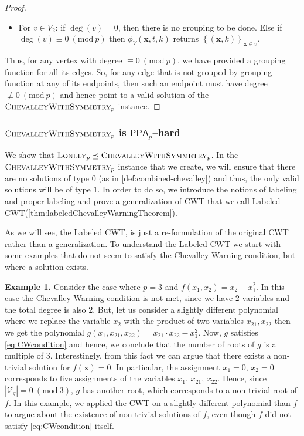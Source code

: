 \documentclass[10pt,a4paper]{article}
\theoremstyle{definition}
\theoremstyle{remark}
\newcommand{\inparen}[1]{\left ( #1 \right )}
\renewcommand{\mod}[1]{~\inparen{\mathrm{mod}~#1}}
\def\abs#1{\left|#1\right|}
\def\set#1{\left\{#1\right\}}
\newcommand{\paragr}[1]{\noindent \textbf{\boldmath #1}}
\newcommand{\bbF}{\ensuremath{\mathbb{F}}}
\newcommand{\calV}{\mathcal{V}}
\newcommand{\vecx}{\ensuremath{\boldsymbol{x}}}
\newcommand{\class}[1]{\ensuremath{\mathsf{#1}}\xspace}
\newcommand{\PPA}{\class{PPA}}
\newcommand{\pnum}{p}
\newcommand{\lonely}{\ensuremath\textsc{Lonely}}
\newcommand{\CWT}{CWT\xspace}
\newcommand{\cChevalleyp}{\textsc{ChevalleyWithSymmetry}_{\pnum}}
\begin{document}
\begin{proof}
\begin{itemize}[label=$\triangleright$,leftmargin=0.5cm]
\begin{itemize}[leftmargin=0.25cm]
		we define the multiset $\set{(\vecx_j, t(\vecx_j))}_{j \in \bbF_p}$.
		Since $\sum\limits_{j = 0}^{p-1} t(\vecx_j) = 0$, this multiset has
		size multiple of $p$, so we can canonically partition it into groups of size $p$. Then,
		$\phi_V(\vecx, t, k)$ returns the group containing $(\vecx,k)$,
		\item For $v \in V_2$: if $\deg(v) = 0$, then there is no grouping to be done. Else if $\deg(v) \equiv 0 \mod{p}$ then $\phi_V(\vecx,t,k)$ returns
          		$\set{(\vecx,k)}_{\vecx \in v}$.
	  \end{itemize}
\end{itemize}
	Thus, for any vertex with degree $\equiv 0 \mod{p}$, we have provided a grouping function for all its edges. So, for any edge that is not grouped by grouping function at any of its endpoints, then such an endpoint must have degree $\not\equiv 0 \mod{p}$ and hence point to a valid solution of the $\cChevalleyp$ instance.
\end{proof}



\subsubsection{$\cChevalleyp$ is $\PPA_p$--hard}

We show that $\lonely_p \preceq \cChevalleyp$. In the $\cChevalleyp$ instance that we create, we will ensure that there are no solutions of type 0 (as in \autoref{def:combined-chevalley}) and thus, the only valid solutions will be of type 1. In order to do so, we introduce the notions of labeling and proper labeling and prove a generalization of \CWT that we call Labeled \CWT (\autoref{thm:labeledChevalleyWarningTheorem}).

As we will see, the Labeled \CWT, is just a
re-formulation of the original \CWT rather than a generalization. To
understand the Labeled \CWT we start with some
examples that do not seem to satisfy the Chevalley-Warning
condition, but where a solution exists.

\bigskip
\paragr{Example 1.} Consider the case where $p = 3$ and
$f(x_1, x_2) = x_2 - x_1^2$. In this case the Chevalley-Warning condition is not met, since we have $2$ variables and the total degree is also
$2$. But, let us consider a slightly different polynomial where we
replace the variable $x_2$ with the product of two variables
$x_{21}, x_{22}$ then we get the polynomial
$g(x_1, x_{21}, x_{22}) = x_{21} \cdot x_{22} - x_1^2$. Now,
$g$ satisfies \eqref{eq:CWcondition} and hence, we
conclude that the number of roots of $g$ is a multiple of $3$.
Interestingly, from this fact we can argue that there exists a non-trivial solution for $f(\vecx) = 0$.
In particular, the assignment $x_1 = 0$, $x_2 = 0$ corresponds to five
assignments of the variables $x_1$, $x_{21}$, $x_{22}$. Hence, since
$\abs{\calV_{g}} = 0 \mod{3}$, $g$ has another root, which corresponds to a
non-trivial root of $f$. In this example, we applied the
\CWT on a slightly different polynomial than $f$
to argue about the existence of non-trivial solutions of $f$, even though $f$ did not satisfy \eqref{eq:CWcondition} itself.
\bigskip
\end{document}
